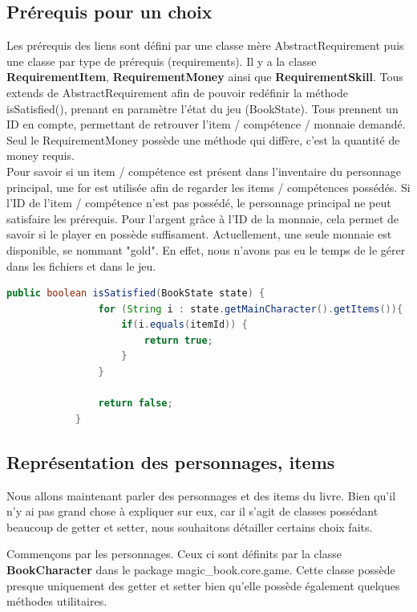 		\subsection{Prérequis pour un choix}
			Les prérequis des liens sont défini par une classe mère AbstractRequirement puis une classe par type de prérequis (requirements). Il y a la classe \textbf{RequirementItem}, \textbf{RequirementMoney} ainsi que \textbf{RequirementSkill}. Tous extends de AbstractRequirement afin de pouvoir redéfinir la méthode isSatisfied(), prenant en paramètre l'état du jeu (BookState). Tous prennent un ID en compte, permettant de retrouver l'item / compétence / monnaie demandé. Seul le RequirementMoney possède une méthode qui diffère, c'est la quantité de money requis.\\
			Pour savoir si un item / compétence est présent dans l'inventaire du personnage principal, une for est utilisée afin de regarder les items / compétences possédés. Si l'ID de l'item / compétence n'est pas possédé, le personnage principal ne peut satisfaire les prérequis. Pour l'argent grâce à l'ID de la monnaie, cela permet de savoir si le player en possède suffisament. Actuellement, une seule monnaie est disponible, se nommant "gold". En effet, nous n'avons pas eu le temps de le gérer dans les fichiers et dans le jeu.

			\begin{lstlisting}[gobble=12, language=java, caption=exemple de isSatisfied(), label=isSatisfied]
			public boolean isSatisfied(BookState state) {
				for (String i : state.getMainCharacter().getItems()){
					if(i.equals(itemId)) {
						return true;
					}
				}

				return false;
			}
			\end{lstlisting}


		\subsection{Représentation des personnages, items}

			Nous allons maintenant parler des personnages et des items du livre. Bien qu'il n'y ai pas grand chose à expliquer sur eux, car il s'agit de classes possédant beaucoup de getter et setter, nous souhaitons détailler certains choix faits.

			Commençons par les personnages. Ceux ci sont définits par la classe \textbf{BookCharacter} dans le package magic\_book.core.game. Cette classe possède presque uniquement des getter et setter bien qu'elle possède également quelques méthodes utilitaires.

